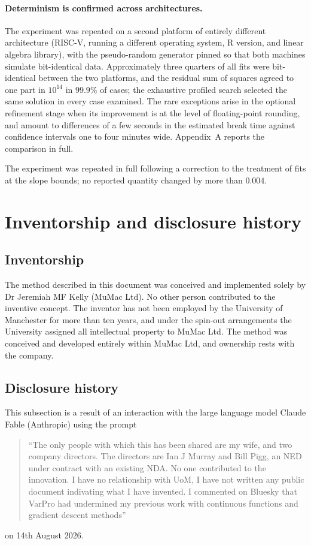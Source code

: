 \documentclass[11pt,a4paper]{article}
\begin{document}
\paragraph{Determinism is confirmed across architectures.}
The experiment was repeated on a second platform of entirely different
architecture (RISC-V, running a different operating system, R version, and
linear algebra library), with the pseudo-random generator pinned so that
both machines simulate bit-identical data. Approximately three quarters of
all fits were bit-identical between the two platforms, and the residual
sum of squares agreed to one part in $10^{14}$ in $99.9\%$ of cases; the
exhaustive profiled search selected the same solution in every case
examined. The rare exceptions arise in the optional refinement stage when
its improvement is at the level of floating-point rounding, and amount to
differences of a few seconds in the estimated break time against
confidence intervals one to four minutes wide. Appendix~A reports the
comparison in full.

The experiment was repeated in full following a correction to the
treatment of fits at the slope bounds; no reported quantity changed by
more than $0.004$.

\section{Inventorship and disclosure history}
\subsection{Inventorship}
The method described in this document was conceived and implemented
solely by Dr Jeremiah MF Kelly (MuMac Ltd). No other person contributed
to the inventive concept. The inventor has not been employed by the
University of Manchester for more than ten years, and under the spin-out
arrangements the University assigned all intellectual property to MuMac
Ltd. The method was conceived and developed entirely within MuMac Ltd,
and ownership rests with the company.

\subsection{Disclosure history}
This subsection is a result of an interaction with the large language model Claude Fable (Anthropic) using the prompt \begin{quote}
``The only people with which this has been shared are my wife, and two company directors. The directors are Ian J Murray and Bill Pigg, an NED under contract with an existing NDA. No one contributed to the innovation. I have no relationship with UoM, I have not written any public document indivating what I have invented. I commented on Bluesky that VarPro had undermined my previous work with continuous functions and gradient descent methods''\end{quote} on 14th August 2026. 
\end{document}
